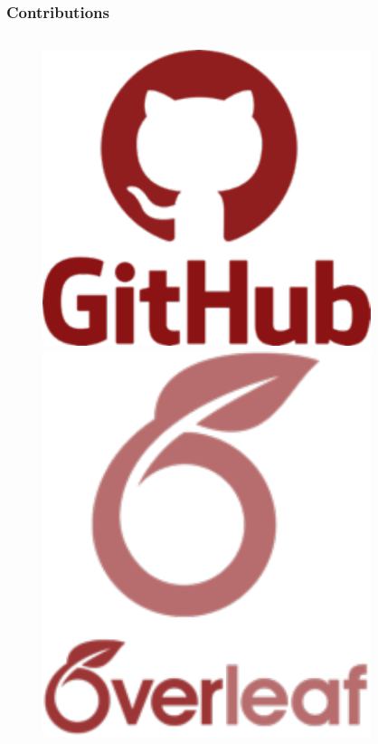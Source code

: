 \begin{frame}
 \frametitle{Contributions}
\begin{columns}
		\begin{column}{0.1\textwidth}

 					\begin{figure}
  						  \centering
   						 \includegraphics[width=0.9\textwidth]{../Tex/Contribute/ContribPictures/github.pdf}\\
   						 	 \includegraphics[width=0.9\textwidth]{../Tex//Contribute/ContribPictures/overleaf.pdf}
				  \end{figure}
		\end{column}
		\begin{column}{0.9\textwidth}
							
		\end{column}
\end{columns}
 \end{frame}
 
 





